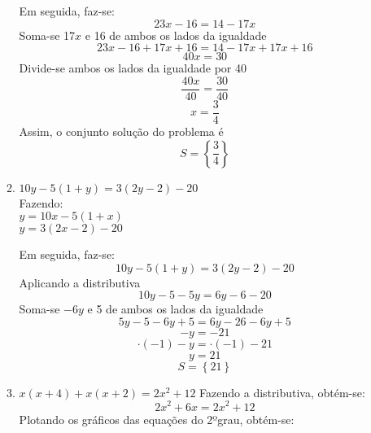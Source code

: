 \begin{enumerate}
\begin{enumerate}
			Em seguida, faz-se:
			\[
			23x-16=14-17x
			\]
			Soma-se 17$x$ e 16 de ambos os lados da igualdade
			\[
			23x-16 +17x +16=14-17x+17x +16
			\]
			\[
			40x = 30
			\]
			Divide-se ambos os lados da igualdade por 40
			\[
			\dfrac{40x}{40} = \dfrac{30}{40}
			\]
			\[
			x=\dfrac{3}{4}
			\]
			Assim, o conjunto solução do problema é
			\[
			S=\left\{ \dfrac{3}{4} \right\}
			\]
			\item $10y-5(1+y)=3(2y-2)-20$\\
			Fazendo:\\
			$y=10x-5(1+x)$\\
			$y=3(2x-2)-20$\\   
   
    \begin{center}
    \end{center}
            
			Em seguida, faz-se:
			\[
			10y-5(1+y)=3(2y-2)-20
			\]
			Aplicando a distributiva
			\[
			10y-5-5y=6y-6-20
			\]
			Soma-se $-6y$ e 5 de ambos os lados da igualdade
			\[
			5y-5-6y+5=6y-26-6y+5
			\]
			\[
			-y = -21
			\]
			\[
			\cdot (-1) -y = \cdot (-1) -21
			\]
			\[
			y = 21
			\]
			\[
			S=\left\{ 21 \right\}
			\]
			\item $x(x+4)+x(x+2) = 2x^2+12$
			Fazendo a distributiva, obtém-se:\\
			\[
			2x^2 + 6x = 2x^2 + 12
			\]  
			Plotando os gráficos das equações do 2ºgrau, obtém-se:\\
   

\end{enumerate}
\end{enumerate}
